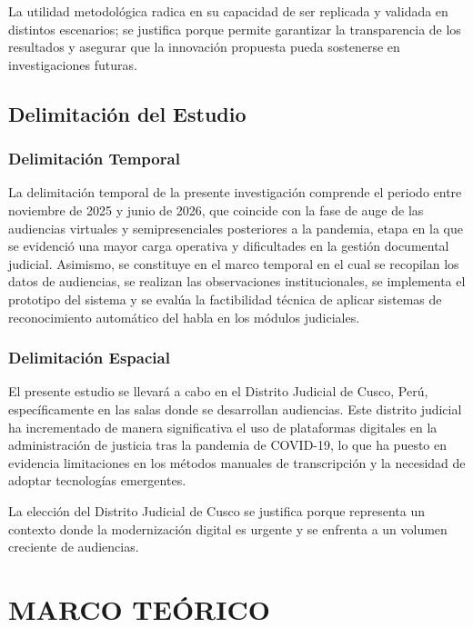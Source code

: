 \documentclass[12pt,a4paper,oneside]{report}
\begin{document}
La utilidad metodológica radica en su capacidad de ser replicada y validada en distintos escenarios; se justifica porque permite garantizar la transparencia de los resultados y asegurar que la innovación propuesta pueda sostenerse en investigaciones futuras.

\section{Delimitación del Estudio}

\subsection{Delimitación Temporal}

La delimitación temporal de la presente investigación comprende el periodo entre noviembre de 2025 y junio de 2026, que coincide con la fase de auge de las audiencias virtuales y semipresenciales posteriores a la pandemia, etapa en la que se evidenció una mayor carga operativa y dificultades en la gestión documental judicial. Asimismo, se constituye en el marco temporal en el cual se recopilan los datos de audiencias, se realizan las observaciones institucionales, se implementa el prototipo del sistema y se evalúa la factibilidad técnica de aplicar sistemas de reconocimiento automático del habla en los módulos judiciales.

\subsection{Delimitación Espacial}

El presente estudio se llevará a cabo en el Distrito Judicial de Cusco, Perú, específicamente en las salas donde se desarrollan audiencias. Este distrito judicial ha incrementado de manera significativa el uso de plataformas digitales en la administración de justicia tras la pandemia de COVID-19, lo que ha puesto en evidencia limitaciones en los métodos manuales de transcripción y la necesidad de adoptar tecnologías emergentes.

La elección del Distrito Judicial de Cusco se justifica porque representa un contexto donde la modernización digital es urgente y se enfrenta a un volumen creciente de audiencias.

\chapter{MARCO TEÓRICO}
\end{document}

